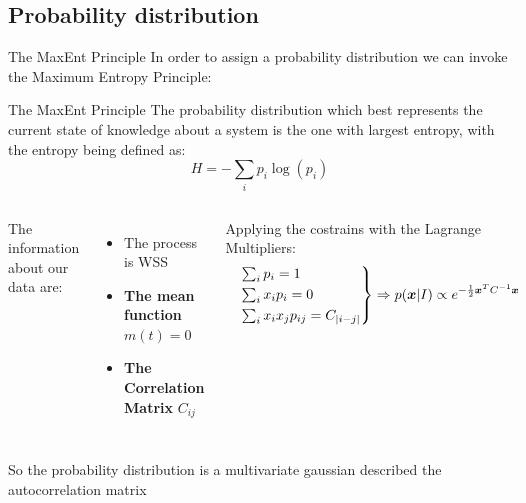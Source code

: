 \documentclass[
10pt,
aspectratio=169,
]{beamer}
\begin{document}
\subsection{Probability distribution}
\begin{frame}{The MaxEnt Principle}
In order to assign a probability distribution we can invoke the Maximum Entropy Principle:
\begin{block}{The MaxEnt Principle}
    The probability distribution which best represents the current state of knowledge about a system is the one with largest entropy, with the entropy being defined as:
    \begin{equation}
        H = -\sum_i p_i \log(p_i)
    \end{equation}
    \end{block}
    \vfill
\begin{columns}
The information about our data are:
\begin{itemize}
    \item The process is WSS
    \item \textbf{The mean function} $m(t)=0$
    \item \textbf{The Correlation Matrix} $C_{ij}$
\end{itemize}
Applying the costrains with the Lagrange Multipliers:
\begin{equation*}
\begin{rcases}
    &\sum_i p_i = 1 \\
    &\sum_i x_i p_i = 0 \\
    &\sum_i x_i x_j p_{ij} = C_{|i-j|}
\end{rcases}\Rightarrow p(\boldsymbol{x}|I) \propto e^{-\frac{1}{2}\boldsymbol{x}^T C^{-1} \boldsymbol{x}}
\end{equation*}
\end{columns}  
\vfill
So the probability distribution is a multivariate gaussian described the autocorrelation matrix
\end{frame}
\end{document}
